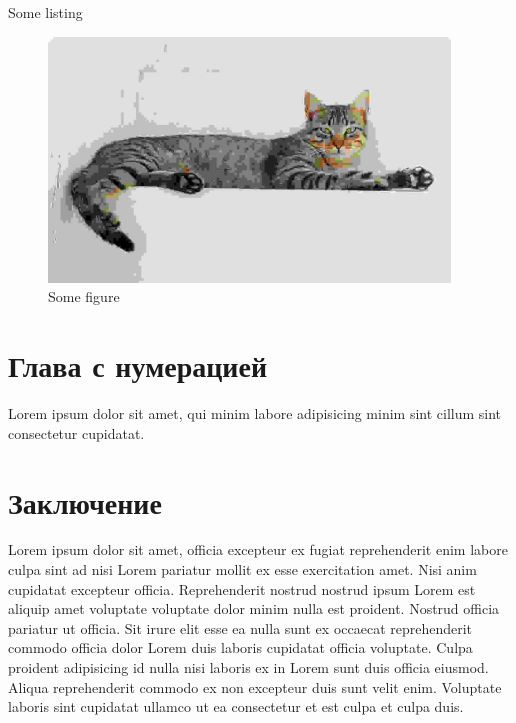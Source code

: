 \documentclass[14pt,a4paper]{extarticle}
\newcommand{\asection}[1]{
	\section*{#1}
	\addcontentsline{toc}{section}{#1}
}
\newenvironment{code}{\captionsetup{type=listing}}{}
\begin{document}
\begin{code}
	\inputminted[fontsize=\footnotesize]{python}{listings/matrix.py}
	\caption{Some listing}
\end{code}

\begin{figure}[H]
	\begin{center}
		\includegraphics[width=0.95\textwidth]{figures/cat.jpg}
	\end{center}
	\caption{Some figure}
\end{figure}

\section{Глава с нумерацией}

Lorem ipsum dolor sit amet, qui minim labore adipisicing minim sint cillum sint
consectetur cupidatat.

\asection{Заключение}

Lorem ipsum dolor sit amet, officia excepteur ex fugiat reprehenderit enim
labore culpa sint ad nisi Lorem pariatur mollit ex esse exercitation amet. Nisi
anim cupidatat excepteur officia. Reprehenderit nostrud nostrud ipsum Lorem est
aliquip amet voluptate voluptate dolor minim nulla est proident. Nostrud
officia pariatur ut officia. Sit irure elit esse ea nulla sunt ex occaecat
reprehenderit commodo officia dolor Lorem duis laboris cupidatat officia
voluptate. Culpa proident adipisicing id nulla nisi laboris ex in Lorem sunt
duis officia eiusmod. Aliqua reprehenderit commodo ex non excepteur duis sunt
velit enim. Voluptate laboris sint cupidatat ullamco ut ea consectetur et est
culpa et culpa duis.

\newpage
\printbibliography[title={Список используемой литературы}]
\end{document}
